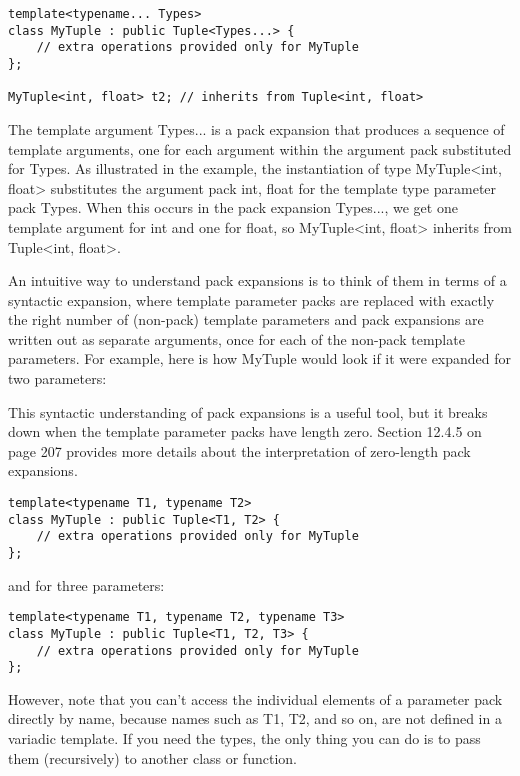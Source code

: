 \begin{lstlisting}[style=styleCXX]
template<typename... Types>
class MyTuple : public Tuple<Types...> {
	// extra operations provided only for MyTuple
};

MyTuple<int, float> t2; // inherits from Tuple<int, float>
\end{lstlisting}

The template argument Types... is a pack expansion that produces a sequence of template arguments, one for each argument within the argument pack substituted for Types. As illustrated in the example, the instantiation of type MyTuple<int, float> substitutes the argument pack int, float for the template type parameter pack Types. When this occurs in the pack expansion Types..., we get one template argument for int and one for float, so MyTuple<int, float> inherits from Tuple<int, float>.

An intuitive way to understand pack expansions is to think of them in terms of a syntactic expansion, where template parameter packs are replaced with exactly the right number of (non-pack) template parameters and pack expansions are written out as separate arguments, once for each of the non-pack template parameters. For example, here is how MyTuple would look if it were expanded for two parameters:

\begin{tcolorbox}[colback=webgreen!5!white,colframe=webgreen!75!black]
\hspace*{0.75cm}This syntactic understanding of pack expansions is a useful tool, but it breaks down when the template parameter packs have length zero. Section 12.4.5 on page 207 provides more details about the interpretation of zero-length pack expansions.
\end{tcolorbox}

\begin{lstlisting}[style=styleCXX]
template<typename T1, typename T2>
class MyTuple : public Tuple<T1, T2> {
	// extra operations provided only for MyTuple
};
\end{lstlisting}

and for three parameters:

\begin{lstlisting}[style=styleCXX]
template<typename T1, typename T2, typename T3>
class MyTuple : public Tuple<T1, T2, T3> {
	// extra operations provided only for MyTuple
};
\end{lstlisting}

However, note that you can’t access the individual elements of a parameter pack directly by name, because names such as T1, T2, and so on, are not defined in a variadic template. If you need the types, the only thing you can do is to pass them (recursively) to another class or function.

